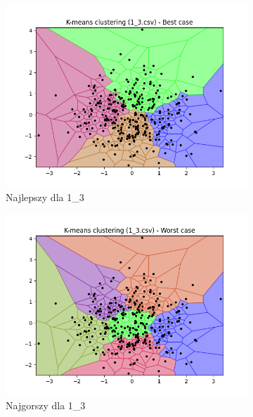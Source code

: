 \documentclass[12pt]{article}
\begin{document}
\begin{figure}[H]
\begin{subfigure}[b]{0.24\textwidth}
        \includegraphics[width=\linewidth]{img/exp_1/kmeans/1_3_best.png}
        \caption{Najlepszy dla 1\_3}
    \end{subfigure}
    \hfill
    \begin{subfigure}[b]{0.24\textwidth}
        \includegraphics[width=\linewidth]{img/exp_1/kmeans/1_3_worst.png}
        \caption{Najgorszy dla 1\_3}
    \end{subfigure}
    \hfill
    \begin{subfigure}[b]{0.24\textwidth}

\end{subfigure}
\end{figure}
\end{document}
